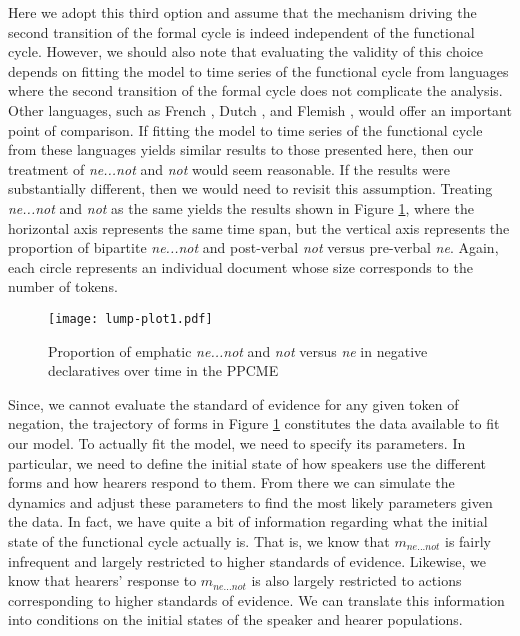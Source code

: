 \documentclass[linguex]{sp}
\theoremstyle{definition} \newtheorem{definition}{Definition}
\begin{document}
Here we adopt this third option and assume that the mechanism driving the second transition of the formal cycle is indeed independent of the functional cycle. However, we should also note that evaluating the validity of this choice depends on fitting the model to time series of the functional cycle from languages where the second transition of the formal cycle does not complicate the analysis. Other languages, such as French \citep{martineau-mougeon2003}, Dutch \citep{burridge1993}, and Flemish \citep{vanderAuwera-neuckermans2004}, would offer an important point of comparison.  If fitting the model to time series of the functional cycle from these languages yields similar results to those presented here, then our treatment of \textit{\color{blue} ne...not} and \textit{\color{green} not} would seem reasonable. If the results were substantially different, then we would need to revisit this assumption.   Treating \textit{\color{blue} ne...not} and \textit{\color{green} not} as the same yields the results shown in Figure \ref{lump-plot1}, where the horizontal axis represents the same time span, but the vertical axis represents the proportion of bipartite \textit{\color{blue} ne...not} and post-verbal  \textit{\color{green} not} versus pre-verbal \textit{\color{red} ne}. Again, each circle represents an individual document whose size corresponds to the number of tokens.


\begin{figure}
\centering
     \texttt{[image: lump-plot1.pdf]}
\caption{Proportion of emphatic \textit{\color{blue} ne...not} and \textit{\color{green} not}  versus  \textit{\color{red}  ne} in negative declaratives over time in the PPCME}
\label{lump-plot1}
\end{figure}

Since, we cannot evaluate the standard of evidence for any given token of negation, the trajectory of forms in Figure \ref{lump-plot1} constitutes the data available to fit our model. To actually fit the model, we need to specify its parameters. In particular, we need to define the initial state of how speakers use the different forms and how hearers respond to them. From there we can simulate the dynamics and adjust these parameters to find the most likely parameters given the data.  In fact, we have quite a bit of information regarding what the initial state of the functional cycle actually is. That is, we know that \textit{\color{blue} $m_{ne...not}$}  is fairly infrequent and largely restricted to higher standards of evidence. Likewise, we know that hearers' response to \textit{\color{blue} $m_{ne...not}$}  is also largely restricted to actions corresponding to higher standards of evidence. We can translate this information into conditions on the initial states of the speaker and hearer populations.
\end{document}
